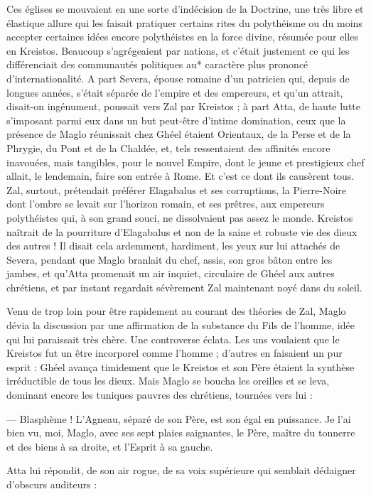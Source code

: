 \documentclass[a4paper, 11pt, oneside, polutonikogreek, french]{article}
\begin{document}
Ces églises se mouvaient en une sorte d'indécision de la Doctrine, une très libre et élastique allure qui les faisait pratiquer certains rites du polythéisme ou du moins accepter certaines idées encore polythéistes en la force divine, résumée pour elles en Kreistos. Beaucoup s'agrégeaient par nations, et c'était justement ce qui les différenciait des communautés politiques au* caractère plus prononcé d'internationalité. A part Severa, épouse romaine d'un patricien qui, depuis de longues années, s'était séparée de l'empire et des empereurs, et qu'un attrait, disait-on ingénument, poussait vers Zal par Kreistos ; à part Atta, de haute lutte s'imposant parmi eux dans un but peut-être d'intime domination, ceux que la présence de Maglo réunissait chez Ghéel étaient Orientaux, de la Perse et de la Phrygie, du Pont et de la Chaldée, et, tels ressentaient des affinités encore inavouées, mais tangibles, pour le nouvel Empire, dont le jeune et prestigieux chef allait, le lendemain, faire son entrée à Rome. Et c'est ce dont ils causèrent tous. Zal, surtout, prétendait préférer Elagabalus et ses corruptions, la Pierre-Noire dont l'ombre se levait sur l'horizon romain, et ses prêtres, aux empereurs polythéistes qui, à son grand souci, ne dissolvaient pas assez le monde. Kreistos naîtrait de la pourriture d'Elagabalus et non de la saine et robuste vie des dieux des autres ! Il disait cela ardemment, hardiment, les yeux sur lui attachés de Severa, pendant que Maglo branlait du chef, assis, son gros bâton entre les jambes, et qu'Atta promenait un air inquiet, circulaire de Ghéel aux autres chrétiens, et par instant regardait sévèrement Zal maintenant noyé dans du soleil.

Venu de trop loin pour être rapidement au courant des théories de Zal, Maglo dévia la discussion par une affirmation de la substance du Fils de l'homme, idée qui lui paraissait très chère. Une controverse éclata. Les uns voulaient que le Kreistos fut un être incorporel comme l'homme ; d'autres en faisaient un pur esprit : Ghéel avança timidement que le Kreistos et son Père étaient la synthèse irréductible de tous les dieux. Mais Maglo se boucha les oreilles et se leva, dominant encore les tuniques pauvres des chrétiens, tournées vers lui :

--- Blasphème ! L'Agneau, séparé de son Père, est son égal en puissance. Je l'ai bien vu, moi, Maglo, avec ses sept plaies saignantes, le Père, maître du tonnerre et des biens à sa droite, et l'Esprit à sa gauche.

Atta lui répondit, de son air rogue, de sa voix supérieure qui semblait dédaigner d'obscurs auditeurs :
\end{document}
